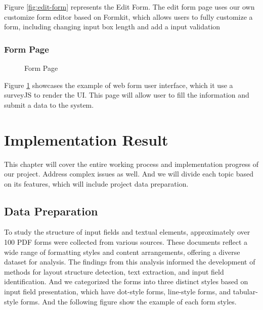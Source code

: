 \documentclass[12pt,oneside,openright,a4paper]{cpe-english-project}
\begin{document}
Figure \ref{fig:edit-form}  represents the Edit Form. The edit form page uses our own customize form editor based on Formkit, which allows users to fully customize a form, including changing input box length and add a input validation

\subsection{Form Page}

\begin{figure}[!h]
\centering
{}
\caption{Form Page}\label{fig:form-page}
\end{figure}

Figure \ref{fig:form-page} showcases the example of web form user interface, which it use a surveyJS to render the UI. This  page will allow user to fill the information and submit a data to the system.


\chapter{Implementation Result}

This chapter will cover the entire working process and implementation progress of our project. Address complex issues as well. And we will divide each topic based on its features, which will include project data preparation.

\section{Data Preparation}

To study the structure of input fields and textual elements, approximately over 100 PDF forms were collected from various sources. These documents reflect a wide range of formatting styles and content arrangements, offering a diverse dataset for analysis. The findings from this analysis informed the development of methods for layout structure detection, text extraction, and input field identification. And we categorized the forms into three distinct styles based on input field presentation, which have dot-style forms, line-style forms, and tabular-style forms. And the following figure show the example of each form styles.
\end{document}
